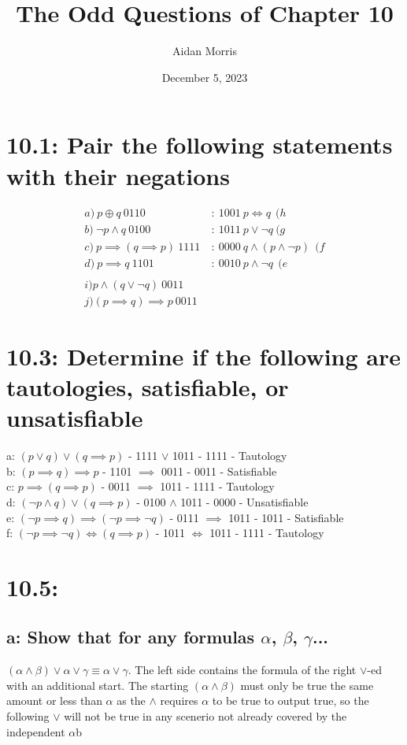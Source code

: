 \documentclass{article}
\title{The Odd Questions of Chapter 10}
\author{Aidan Morris}
\date{December 5, 2023}
\begin{document}
\maketitle
\pagebreak

\section*{10.1: Pair the following statements with their negations}
\begin{align*}
  a)\  p \oplus q \: 0110 \ &: \ 1001 \:p \Leftrightarrow q \: \ (h \\
  b)\  \neg p \land q \: 0100 \ &: \ 1011 \:p \lor \neg q \: (g \\
  c)\  p \implies (q \implies p) \: 1111 \ &: \ 0000 \: q \land (p \land \neg p) \: \ (f \\
  d)\  p \implies q \: 1101 \ &: \ 0010 \: p \land \neg q \: \ (e \\
  \\
  i) p \land (q \lor \neg q) \:0011 \\
  j) (p \implies q) \implies p \:0011
\end{align*}
\section*{10.3: Determine if the following are tautologies, satisfiable, or unsatisfiable}
a: $(p \lor q) \lor (q \implies p)$ \:- 1111 $\lor$ 1011 \:- 1111 \:- Tautology \\
b: $(p \implies q) \implies p$ \:- 1101 $\implies$ 0011 \:- 0011 \:- Satisfiable \\
c: $p \implies (q \implies p)$ \:- 0011 $\implies$ 1011 \:- 1111 \:- Tautology \\
d: $(\neg p \land q) \lor (q \implies p)$ \:- 0100 $\land$ 1011 \:- 0000 \:- Unsatisfiable \\
e: $(\neg p \implies q) \implies (\neg p \implies \neg q)$ \:- 0111 $\implies$ 1011 \:- 1011 \:- Satisfiable \\
f: $(\neg p \implies \neg q) \Leftrightarrow (q \implies p)$ \:- 1011 $\Leftrightarrow$ 1011 \:- 1111 \: - Tautology

\section*{10.5: }
\subsection*{a: Show that for any formulas $\alpha$, $\beta$, $\gamma$...}
$(\alpha \land \beta) \lor \alpha \lor \gamma \equiv \alpha \lor \gamma$.
The left side contains the formula of the right $\lor$-ed with an additional start. The starting $(\alpha \land \beta)$ must only be true the same amount or less than $\alpha$ as the $\land$ requires $\alpha$ to be true to output true, so the following $\lor$ will not be true in any scenerio not already covered by the independent $\alpha$b
\end{document}
